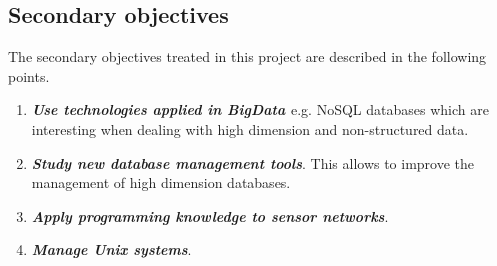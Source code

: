 \subsection{Secondary objectives}

The secondary objectives treated in this project are described in the following points.

\begin{enumerate}

\item \textbf{\textit{Use technologies applied in BigData \cite{noauthor_que_2012, powerdata_big_nodate, noauthor_how_2015}}} e.g. NoSQL \cite{noauthor_concepto_nodate, noauthor_nosql_2015, noauthor_nosql_nodate} databases which are interesting when dealing with high dimension and non-structured data.

\item \textbf{\textit{Study new database management tools}}. This allows to improve the management of high dimension databases.

\item \textbf{\textit{Apply programming knowledge to sensor networks}}.

\item \textbf{\textit{Manage Unix systems}}.

\end{enumerate}






